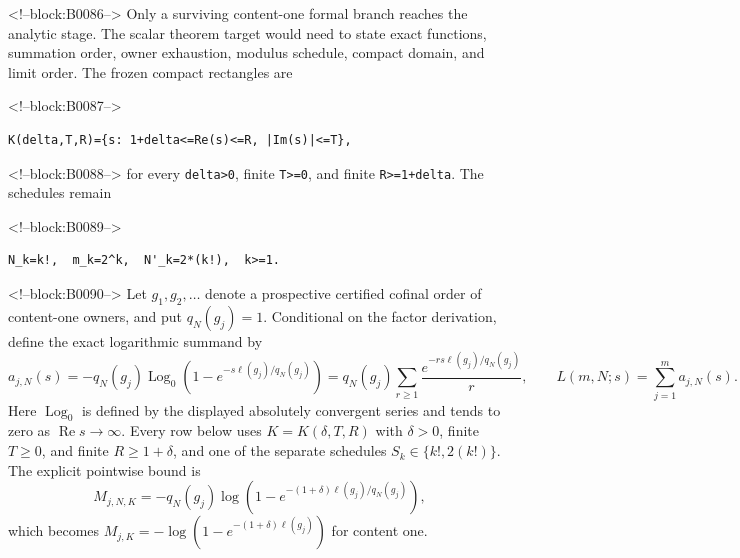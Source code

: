 \documentclass[11pt]{article}
\begin{document}
<!--block:B0086-->
Only a surviving content-one formal branch reaches the analytic stage.
The scalar theorem target would need to state exact functions, summation
order, owner exhaustion, modulus schedule, compact domain, and limit
order. The frozen compact rectangles are

<!--block:B0087-->
\begin{verbatim}
K(delta,T,R)={s: 1+delta<=Re(s)<=R, |Im(s)|<=T},
\end{verbatim}

<!--block:B0088-->
for every \texttt{delta\textgreater{}0}, finite
\texttt{T\textgreater{}=0}, and finite \texttt{R\textgreater{}=1+delta}.
The schedules remain

<!--block:B0089-->
\begin{verbatim}
N_k=k!,  m_k=2^k,  N'_k=2*(k!),  k>=1.
\end{verbatim}

<!--block:B0090-->
Let \(g_1,g_2,\ldots\) denote a prospective certified cofinal order of
content-one owners, and put \(q_N(g_j)=1\).  Conditional on the factor derivation,
define the exact logarithmic summand by
\[
 a_{j,N}(s)=-q_N(g_j)\operatorname{Log}_0
 \!\left(1-e^{-s\ell(g_j)/q_N(g_j)}\right)
 =q_N(g_j)\sum_{r\geq1}\frac{e^{-rs\ell(g_j)/q_N(g_j)}}r,
 \qquad L(m,N;s)=\sum_{j=1}^m a_{j,N}(s).
\]
Here \(\operatorname{Log}_0\) is defined by the displayed absolutely convergent
series and tends to zero as \(\operatorname{Re}s\to\infty\).  Every row below
uses
\(K=K(\delta,T,R)\) with \(\delta>0\), finite \(T\geq0\), and finite
\(R\geq1+\delta\), and one of the separate schedules
\(S_k\in\{k!,2(k!)\}\).  The explicit pointwise bound is
\[
 M_{j,N,K}=-q_N(g_j)\log\!\left(1-e^{-(1+\delta)\ell(g_j)/q_N(g_j)}\right),
\]
which becomes \(M_{j,K}=-\log(1-e^{-(1+\delta)\ell(g_j)})\) for content one.
\end{document}
